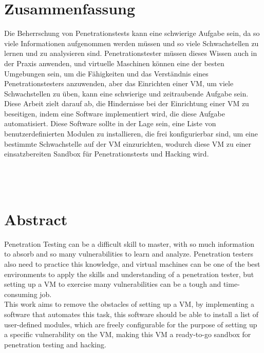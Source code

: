 \chapter*{Zusammenfassung}

Die Beherrschung von Penetrationstests kann eine schwierige Aufgabe sein, da so viele Informationen aufgenommen werden müssen und so viele Schwachstellen zu lernen und zu analysieren sind. Penetrationstester müssen dieses Wissen auch in der Praxis anwenden, und virtuelle Maschinen können eine der besten Umgebungen sein, um die Fähigkeiten und das Verständnis eines Penetrationstesters anzuwenden, aber das Einrichten einer VM, um viele Schwachstellen zu üben, kann eine schwierige und zeitraubende Aufgabe sein.\\
Diese Arbeit zielt darauf ab, die Hindernisse bei der Einrichtung einer VM zu beseitigen, indem eine Software implementiert wird, die diese Aufgabe automatisiert. Diese Software sollte in der Lage sein, eine Liste von benutzerdefinierten Modulen zu installieren, die frei konfigurierbar sind, um eine bestimmte Schwachstelle auf der VM einzurichten, wodurch diese VM zu einer einsatzbereiten Sandbox für Penetrationstests und Hacking wird.
\\
\\
\\
\\
\chapter*{Abstract}

Penetration Testing can be a difficult skill to master, with so much information to absorb and so many vulnerabilities to learn and analyze. Penetration testers also need to practice this knowledge, and virtual machines can be one of the best environments to apply the skills and understanding of a penetration tester, but setting up a VM to exercise many vulnerabilities can be a tough and time-consuming job.\\
This work aims to remove the obstacles of setting up a VM, by implementing a software that automates this task, this software should be able to install a list of user-defined modules, which are freely configurable for the purpose of setting up a specific vulnerability on the VM, making this VM a ready-to-go sandbox for penetration testing and hacking.
